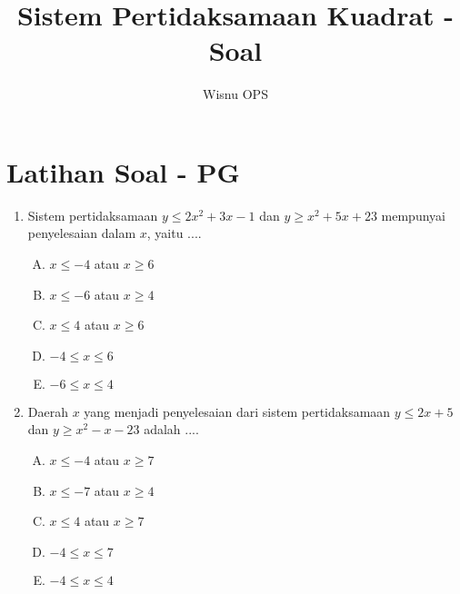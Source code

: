 \documentclass[fleqn, a4paper, 12pt]{article} %
\title{Sistem Pertidaksamaan Kuadrat - Soal}
\author{Wisnu OPS}
\begin{document}
\maketitle

\tableofcontents

\section{Latihan Soal - PG}

	\begin{enumerate}		
		\item Sistem pertidaksamaan $y \leq 2x^2 + 3x - 1$ dan $y \geq x^2 + 5x + 23$ mempunyai penyelesaian dalam $x$, yaitu ....
		\begin{enumerate}[(A)]
			\item $x \leq -4$ atau $x \geq 6$
			\item $x \leq -6$ atau $x \geq 4$
			\item $x \leq 4$ atau $x \geq 6$
			\item $-4 \leq x \leq 6$
			\item $-6 \leq x \leq 4$			
		\end{enumerate}
		\item Daerah $x$ yang menjadi penyelesaian dari sistem pertidaksamaan $y \leq 2x + 5$ dan $y \geq x^2 - x - 23$ adalah ....
		\begin{enumerate}[(A)]
			\item $x \leq -4$ atau $x \geq 7$
			\item $x \leq -7$ atau $x \geq 4$
			\item $x \leq 4$ atau $x \geq 7$
			\item $-4 \leq x \leq 7$
			\item $-4 \leq x \leq 4$
		\end{enumerate}
		
		\newpage
		

\end{enumerate}
\end{document}
